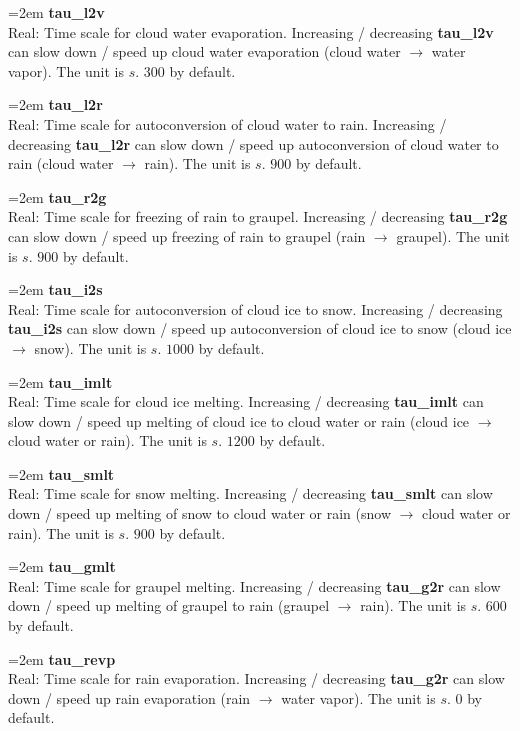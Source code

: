 \documentclass[letterpaper,titlepage,10pt]{article}
\numberwithin{equation}{section}
\begin{document}
\begin{appendices}
\hangindent=2em
\textbf{tau\_l2v}\\ Real: Time scale for cloud water evaporation. Increasing / decreasing \textbf{tau\_l2v} can slow down / speed up cloud water evaporation (cloud water $\rightarrow$ water vapor). The unit is $s$. $300$ by default.

\hangindent=2em
\textbf{tau\_l2r}\\ Real: Time scale for autoconversion of cloud water to rain. Increasing / decreasing \textbf{tau\_l2r} can slow down / speed up autoconversion of cloud water to rain (cloud water $\rightarrow$ rain). The unit is $s$. $900$ by default.

\hangindent=2em
\textbf{tau\_r2g}\\ Real: Time scale for freezing of rain to graupel. Increasing / decreasing \textbf{tau\_r2g} can slow down / speed up freezing of rain to graupel (rain $\rightarrow$ graupel). The unit is $s$. $900$ by default.

\hangindent=2em
\textbf{tau\_i2s}\\ Real: Time scale for autoconversion of cloud ice to snow. Increasing / decreasing \textbf{tau\_i2s} can slow down / speed up autoconversion of cloud ice to snow (cloud ice $\rightarrow$ snow). The unit is $s$. $1000$ by default.

\hangindent=2em
\textbf{tau\_imlt}\\ Real: Time scale for cloud ice melting. Increasing / decreasing \textbf{tau\_imlt} can slow down / speed up melting of cloud ice to cloud water or rain (cloud ice $\rightarrow$ cloud water or rain). The unit is $s$. $1200$ by default.

\hangindent=2em
\textbf{tau\_smlt}\\ Real: Time scale for snow melting. Increasing / decreasing \textbf{tau\_smlt} can slow down / speed up melting of snow to cloud water or rain (snow $\rightarrow$ cloud water or rain). The unit is $s$. $900$ by default.

\hangindent=2em
\textbf{tau\_gmlt}\\ Real: Time scale for graupel melting. Increasing / decreasing \textbf{tau\_g2r} can slow down / speed up melting of graupel to rain (graupel $\rightarrow$ rain). The unit is $s$. $600$ by default.

\hangindent=2em
\textbf{tau\_revp}\\ Real: Time scale for rain evaporation. Increasing / decreasing \textbf{tau\_g2r} can slow down / speed up rain evaporation (rain $\rightarrow$ water vapor). The unit is $s$. $0$ by default.


\end{appendices}
\end{document}
